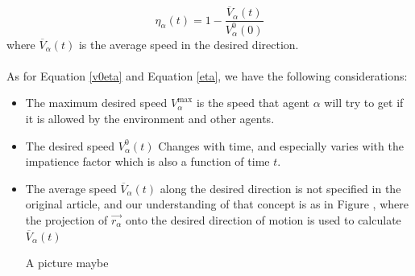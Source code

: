 \begin{equation}\label{eta}
	\eta_{\alpha} \left( t \right) =
    1 - \frac{\overline{V}_{\alpha} \left( t \right)}
             {V_{\alpha}^{0} \left( 0 \right)}
\end{equation}
where $\overline{V}_{\alpha}\left( t \right)$ is the average speed in the desired direction.\\\\
As for Equation \ref{v0eta} and Equation \ref{eta}, we have the following considerations:
\begin{itemize}
\item The maximum desired speed $V_{\alpha}^{\text{max}}$ is the speed that agent $\alpha$ will try to get if it is allowed by the 
environment and other agents. 
\item The desired speed $V_{\alpha}^{0} \left( t \right)$ Changes with time, and especially varies with the impatience factor which is also a function of time $ t $.
\item The average speed $\overline{V}_{\alpha} \left( t \right)$ along the desired direction is not specified in the original article, and our understanding of that concept is as in Figure , where the projection of $ \vec{r_{\alpha}} $ onto the desired direction of motion is used to calculate $\overline{V}_{\alpha} \left( t \right)$

A picture maybe


\end{itemize}
